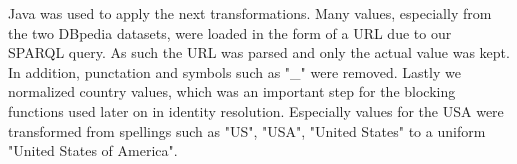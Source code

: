 Java was used to apply the next transformations. Many values, especially from the two DBpedia datasets, were loaded in the form of a URL due to our SPARQL query. As such the URL was parsed and only the actual value was kept. In addition, punctation and symbols such as "\_" were removed. Lastly we normalized country values, which was an important step for the blocking functions used later on in identity resolution. Especially values for the USA were transformed from spellings such as "US", "USA", "United States" to a uniform "United States of America".









